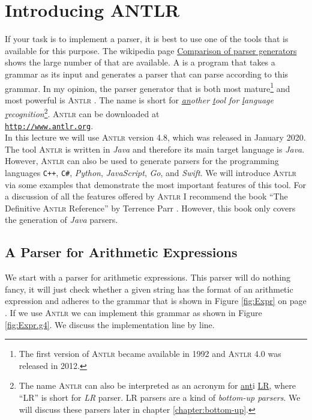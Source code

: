 \chapter{Introducing ANTLR}
If your task is to implement a parser, it is best to use one of the tools that is available for this purpose.
The wikipedia page 
\href{https://en.wikipedia.org/wiki/Comparison_of_parser_generators}{Comparison of parser generators}
shows the large number of  that are available.  
A   is a program that takes a grammar as
its input and generates a parser that can parse according to this grammar.
In my opinion, the parser generator that is both most mature\footnote{
  The first version of \textsc{Antlr} became available in 1992 and \textsc{Antlr} 4.0 was released in 2012.
} and most powerful is
\textsc{Antlr}  \cite{parr:2012,parr:2014}.  The name is short for 
\emph{\underline{an}other \underline{t}ool for \underline{l}anguage \underline{r}ecognition}\footnote{
  The name \textsc{Antlr} can also be interpreted as an acronym for \underline{ant}i \underline{LR},
  where ``LR'' is short for \emph{LR} parser.  LR parsers are a kind of \emph{bottom-up parsers}.  We will discuss these
  parsers later in chapter \ref{chapter:bottom-up}.
}.
\textsc{Antlr} can be downloaded at 
\\[0.2cm]
\hspace*{1.3cm}
\href{http://www.antlr.org}{\texttt{http://www.antlr.org}}.
\\[0.2cm]
In this lecture we will use \textsc{Antlr} version 4.8, which was released in January 2020.  The tool \textsc{Antlr} is written in \textsl{Java}
and therefore its main target language is \textsl{Java}.  However, \textsc{Antlr} can also be used to generate
parsers for the programming languages \texttt{C++}, \texttt{C\#}, \textsl{Python}, \textsl{JavaScript},
\textsl{Go}, and \textsl{Swift}. 
We will introduce \textsc{Antlr} via some examples that demonstrate the most important features of this tool.
For a discussion of all the features offered by \textsc{Antlr} I recommend the book 
``The Definitive \textsc{Antlr} Reference'' by Terrence Parr \cite{parr:2012}.  However, this book only covers
the generation of \textsl{Java} parsers. 

\section{A Parser for Arithmetic Expressions}
We start with a parser for arithmetic expressions.  This parser will do nothing fancy, it will just check
whether a given string has the format of an arithmetic expression and adheres to 
the grammar that is shown in Figure \ref{fig:Expr} on page \pageref{fig:Expr}.
If we use \textsc{Antlr} we can implement this grammar as shown in Figure \ref{fig:Expr.g4}.  
We discuss the implementation line by line.

